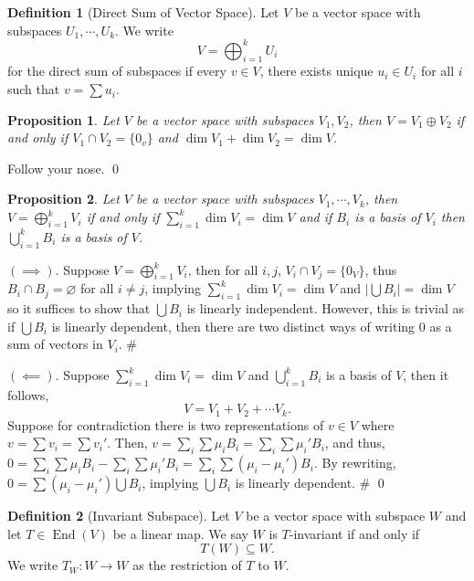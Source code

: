 \documentclass[
]{article}
\newtheorem{prop}{Proposition}[section]
\theoremstyle{definition}
\newtheorem{definition}{Definition}[section]
\begin{document}
\begin{definition}[Direct Sum of Vector Space]
  Let \(V\) be a vector space with subspaces \(U_1, \cdots, U_k\). We write 
  \[V = \bigoplus_{i = 1}^k U_i\]
  for the direct sum of subspaces if every \(v \in V\), there exists unique 
  \(u_i \in U_i\) for all \(i\) such that \(v = \sum u_i\).
\end{definition}

\begin{prop}
  Let \(V\) be a vector space with subspaces \(V_1, V_2\), then 
  \(V = V_1 \oplus V_2\) if and only if \(V_1 \cap V_2 = \{0_v\}\) and 
  \(\dim V_1 + \dim V_2 = \dim V\).
\end{prop}
\proof

Follow your nose. \qed

\begin{prop}
  Let \(V\) be a vector space with subspaces \(V_1, \cdots, V_k\), then 
  \(V = \bigoplus_{i = 1}^k V_i\) if and only if 
  \(\sum_{i = 1}^k \dim V_i = \dim V\) and if \(B_i\) is a basis of \(V_i\) then 
  \(\bigcup_{i = 1}^k B_i\) is a basis of \(V\).
\end{prop}
\proof

\((\implies)\). Suppose \(V = \bigoplus_{i = 1}^k V_i\), then for all
\(i, j\), \(V_i \cap V_j = \{0_V\}\), thus
\(B_i \cap B_j = \varnothing\) for all \(i \neq j\), implying
\(\sum_{i = 1}^k \dim V_i = \dim V\) and
\(\left| \bigcup B_i \right| = \dim V\) so it suffices to show that
\(\bigcup B_i\) is linearly independent. However, this is trivial as if
\(\bigcup B_i\) is linearly dependent, then there are two distinct ways
of writing 0 as a sum of vectors in \(V_i\). \#

\((\impliedby)\). Suppose \(\sum_{i = 1}^k \dim V_i = \dim V\) and
\(\bigcup_{i = 1}^k B_i\) is a basis of \(V\), then it follows,
\[V = V_1 + V_2 + \cdots V_k.\] Suppose for contradiction there is two
representations of \(v \in V\) where \(v = \sum v_i = \sum v_i'\). Then,
\(v = \sum_i \sum \mu_i B_i =  \sum_i \sum \mu_i' B_i\), and thus,
\(0 = \sum_i \sum \mu_i B_i -  \sum_i \sum \mu_i' B_i = \sum_i \sum (\mu_i - \mu_i') B_i\).
By rewriting, \(0 = \sum (\mu_i - \mu_i') \bigcup B_i\), implying
\(\bigcup B_i\) is linearly dependent. \# \qed

\begin{definition}[Invariant Subspace]
  Let \(V\) be a vector space with subspace \(W\) and let \(T \in \mathop{\mathrm{End}}(V)\) be 
  a linear map. We say \(W\) is \(T\)-invariant if and only if 
  \[T(W) \subseteq W.\]
  We write \(T_W : W \to W\) as the restriction of \(T\) to \(W\).
\end{definition}
\end{document}
